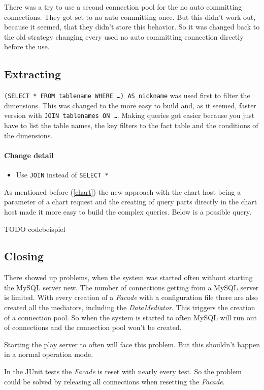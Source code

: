 There was a try to use a second connection pool for the no auto committing connections.
They got set to no auto committing once. But this didn't work out, because it seemed,
that they didn't store this behavior. So it was changed back to the old strategy
changing every used no auto committing connection directly before the use.

\subsection{Extracting}
\texttt{(SELECT * FROM tablename WHERE \ldots) AS nickname} was used first to filter the dimensions.
This was changed to the more easy to build and, as it seemed, faster version with
\texttt{JOIN tablenames ON \ldots}. Making queries got easier because you just have to
list the table names, the key filters to the fact table and the conditions of the dimensions.

\paragraph{Change detail} 
\begin{itemize}
  \item Use \texttt{JOIN} instead of \texttt{SELECT *}
\end{itemize}

As mentioned before (\ref{chart}) the new approach with the chart host being a parameter
of a chart request and the creating of query parts directly in the chart host
made it more easy to build the complex queries. Below is a possible query.

TODO codebeispiel

\subsection{Closing}
There showed up problems, when the system was started often without starting the MySQL server new.
The number of connections getting from a MySQL server is limited. With every creation of a \textit{Facade}
with a configuration file there are also created all the mediators, including the \textit{DataMediator}.
This triggers the creation of a connection pool. So when the system is started to often
MySQL will run out of connections and the connection pool won't be created.

Starting the play server to often will face this problem. But this shouldn't happen in a normal
operation mode.

In the JUnit tests the \textit{Facade} is reset with nearly every test. So the problem could be
solved by releasing all connections when resetting the \textit{Facade}. 

